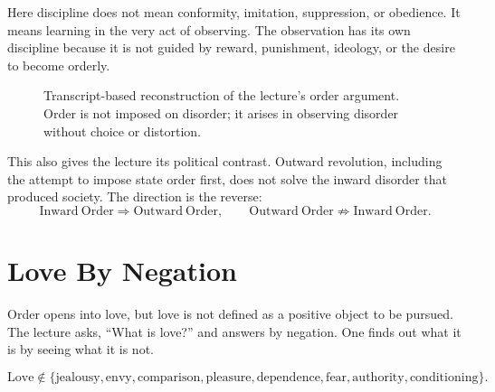 \documentclass[11pt,oneside]{book}
\begin{document}
Here discipline does not mean conformity, imitation, suppression, or obedience. It means learning in the very act of observing. The observation has its own discipline because it is not guided by reward, punishment, ideology, or the desire to become orderly.

\begin{figure}
\centering
{}

Transcript-based reconstruction of the lecture's order argument. Order is not imposed on disorder; it arises in observing disorder without choice or distortion.
\end{figure}

This also gives the lecture its political contrast. Outward revolution, including the attempt to impose state order first, does not solve the inward disorder that produced society. The direction is the reverse:
\begin{equation}
\mathrm{Inward\ Order} \Rightarrow \mathrm{Outward\ Order},
\qquad
\mathrm{Outward\ Order} \not\Rightarrow \mathrm{Inward\ Order}.
\end{equation}

\section{Love By Negation}

Order opens into love, but love is not defined as a positive object to be pursued. The lecture asks, ``What is love?'' and answers by negation. One finds out what it is by seeing what it is not.

\begin{equation}
\mathrm{Love} \notin
\{\mathrm{jealousy},\mathrm{envy},\mathrm{comparison},\mathrm{pleasure},
\mathrm{dependence},\mathrm{fear},\mathrm{authority},\mathrm{conditioning}\}.
\end{equation}
\end{document}
